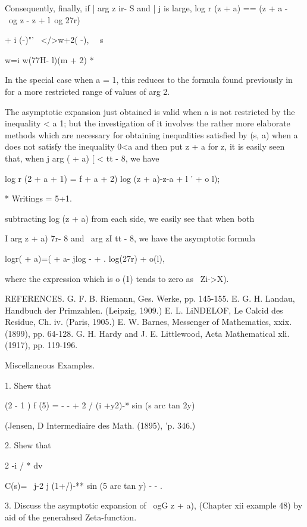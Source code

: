 {{Consequently, finally, if | arg z ir- S and | j is large, log r (z +
a) == (z + a -~ \ og z - z + l\ og 27r)

+ i (-)"'~ </>w+2( -), \ \ s

w=i w(77H- l)(m + 2) *

In the special case when a = 1, this reduces to the formula found
previously in for a more restricted range of values of arg 2.

The asymptotic expansion just obtained is valid when a is not
restricted by the inequality < a 1; but the investigation of it
involves the rather more elaborate methods which are necessary for
obtaining inequalities satisfied by (s, a) when a does not satisfy the
inequality 0<a%
and then put z + a for z, it is easily seen that, when j arg ( + a) [
< tt - 8, we have

log r (2 + a + 1) = f + a + 2) log (z + a)-z-a + l ' + o l);

* Writings = 5+1.

%
%

subtracting log (z + a) from each side, we easily see that when both

I arg z + a) 7r- 8 and \ arg zI tt - 8, we have the asymptotic formula

logr( + a)=( + a- jlog - + . log(27r) + o(l),

where the expression which is o (1) tends to zero as \ Zi->X).

REFERENCES. G. F. B. Riemann, Ges. Werke, pp. 145-155. E. G. H.
Landau, Handbuch der Primzahlen. (Leipzig, 1909.) E. L. LiNDELOF, Le
Calcid des Residue, Ch. iv. (Paris, 1905.) E. W. Barnes, Messenger of
Mathematics, xxix. (1899), pp. 64-128. G. H. Hardy and J. E.
Littlewood, Acta Mathematical xli. (1917), pp. 119-196.

Miscellaneous Examples.

1. Shew that

(2 - 1 ) f (5) = - - + 2 / (i +y2)-* sin (s arc tan 2y)

(Jensen, D Intermediaire des Math. (1895), 'p. 346.)

2. Shew that

2 -i / * dv

C(s)= \ j-2 j (1+/)-** sin (5 arc tan y) - - .


3. Discuss the asymptotic expansion of \ ogG z + a), (Chapter xii
example 48) by aid of the generahsed Zeta-function. 

}}

